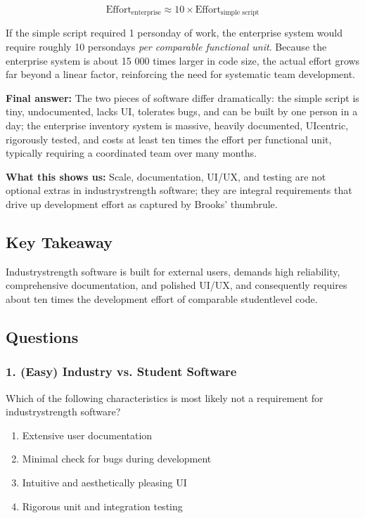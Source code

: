 \documentclass[12pt, a4paper]{article}
\begin{document}
\[
\text{Effort}_{\text{enterprise}} \approx 10 \times \text{Effort}_{\text{simple script}}
\]

If the simple script required 1 personday of work, the enterprise system would require roughly 10 persondays \emph{per comparable functional unit}.  Because the enterprise system is about 15 000 times larger in code size, the actual effort grows far beyond a linear factor, reinforcing the need for systematic team development.  

\textbf{Final answer:} The two pieces of software differ dramatically: the simple script is tiny, undocumented, lacks UI, tolerates bugs, and can be built by one person in a day; the enterprise inventory system is massive, heavily documented, UIcentric, rigorously tested, and costs at least ten times the effort per functional unit, typically requiring a coordinated team over many months.  

\textbf{What this shows us:} Scale, documentation, UI/UX, and testing are not optional extras in industrystrength software; they are integral requirements that drive up development effort as captured by Brooks' thumbrule.  

\subsection{Key Takeaway}
Industrystrength software is built for external users, demands high reliability, comprehensive documentation, and polished UI/UX, and consequently requires about ten times the development effort of comparable studentlevel code.

\subsection{Questions}
\newpage
\subsubsection{1. (Easy)  \hfill \textbf{Industry vs. Student Software}}
Which of the following characteristics is most likely not a requirement for industrystrength software?
\begin{enumerate}[label=\alph.]
  \item Extensive user documentation
  \item Minimal check for bugs during development
  \item Intuitive and aesthetically pleasing UI
  \item Rigorous unit and integration testing
\end{enumerate}
\end{document}
